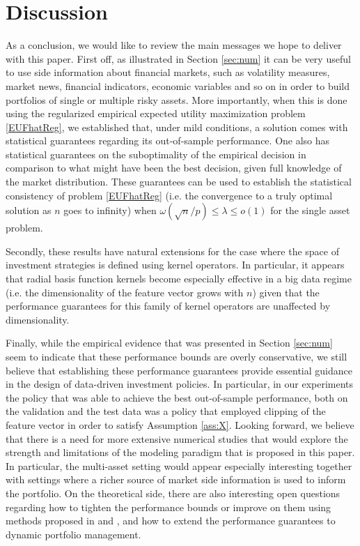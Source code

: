\documentclass[]{interact}
\theoremstyle{plain}%
\theoremstyle{definition}
\theoremstyle{remark}
\newcommand{\0}{\V{0}}
\newcommand{\1}{\V{1}}
\newcommand{\modified}[1]{{\color{blue} #1}}
\theoremstyle{plain}
\theoremstyle{definition}
\begin{document}
%
\section{\modified{Discussion}}\label{sec:conc}

As a conclusion, we would like to review the main messages we hope to deliver with this
paper. First off, as illustrated in Section \ref{sec:num} it can be very useful to use side information about financial markets, such as volatility measures, market
news, financial indicators, economic variables and so on in order to build portfolios of single or multiple risky assets. More importantly, when this is done using the regularized empirical expected utility maximization problem \eqref{EUFhatReg}, we established that, under mild conditions, a solution comes with statistical guarantees regarding its out-of-sample performance. One also has statistical guarantees on the suboptimality of the empirical decision in comparison to what might have been the best decision, given full knowledge of the market distribution.  These guarantees can be used to establish the statistical consistency of problem \eqref{EUFhatReg}  (i.e. the convergence to a truly optimal solution as $n$ goes to infinity)  when $\omega(\sqrt{n}/p)\leq \lambda \leq o(1)$ for the single asset problem.  

Secondly, these results have natural extensions for the case where the space of investment strategies is defined using kernel operators. In particular, it appears that radial basis function kernels become especially effective in a big data regime (i.e. the dimensionality of the feature vector grows with $n$)  given that the performance guarantees for this family of kernel operators are unaffected by dimensionality.

Finally, while the empirical evidence that was presented in Section \ref{sec:num} seem to indicate that these performance bounds are overly conservative, we still believe that establishing these performance guarantees provide essential guidance in the design of data-driven investment policies. In particular, in our experiments the policy that was able to achieve the best out-of-sample performance, both on the validation and the test data was a policy that employed clipping of the feature vector in order to satisfy Assumption \ref{ass:X}. Looking forward, we believe that there is a need for more extensive numerical studies that would explore the strength and limitations of the modeling paradigm that is proposed in this paper. In particular, the multi-asset setting would appear especially interesting together with settings where a richer source of market side information is used to inform the portfolio. On the theoretical side, there are also interesting open questions regarding how to tighten the performance bounds or improve on them using methods proposed in \cite{soroosh2017} and \cite{Duchi2017}, and how to extend the performance guarantees to dynamic portfolio management.
\end{document}
